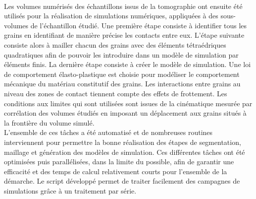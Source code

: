 \paragraph{}
Les volumes numérisés des échantillons issus de la tomographie ont ensuite été utilisés pour la réalisation de simulations numériques, appliquées à des sous-volumes de l'échantillon étudié. Une première étape consiste à identifier tous les grains en identifiant de manière précise les contacts entre eux. L'étape suivante consiste alors à mailler chacun des grains avec des éléments tétraédriques quadratiques afin de pouvoir les introduire dans un modèle de simulation par éléments finis. La dernière étape consiste à créer le modèle de simulation. Une loi de comportement élasto-plastique est choisie pour modéliser le comportement mécanique du matériau constitutif des grains. Les interactions entre grains au niveau des zones de contact tiennent compte des effets de frottement. Les conditions aux limites qui sont utilisées sont issues de la cinématique mesurée par corrélation des volumes étudiés en imposant un déplacement aux grains situés à la frontière du volume simulé.
\\L'ensemble de ces tâches a été automatisé et de nombreuses routines interviennent pour permettre la bonne réalisation des étapes de segmentation, maillage et génération des modèles de simulation. Ces différentes tâches ont été optimisées puis parallélisées, dans la limite du possible, afin de garantir une efficacité et des temps de calcul relativement courts pour l'ensemble de la démarche. Le script développé permet de traiter facilement des campagnes de simulations grâce à un traitement par série.

